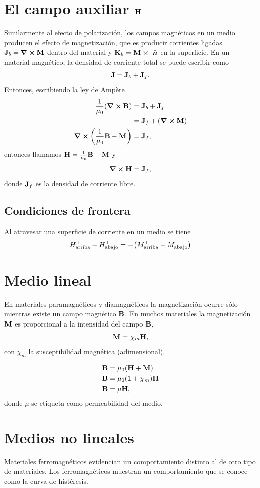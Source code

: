 \section{El campo auxiliar $\vb{H}$}
Similarmente al efecto de polarización, los campos magnéticos 
en un medio producen el efecto de magnetización, que es 
producir corrientes ligadas $\vb{J}_b=\curl{\vb{M}}$ dentro del 
material y $\vb{K}_b=\vb{M}\cp \uv{n}$ en la superficie. En un 
material magnético, la densidad de corriente total se puede 
escribir como 
\begin{align}
\vb{J}=\vb{J}_b+\vb{J}_f.
\end{align}
Entonces, escribiendo la ley de Ampère
\begin{align}
\frac{1}{\mu_0}\qty(\curl{\vb{B}})&=\vb{J}_b+\vb{J}_f\\
&=\vb{J}_f+\qty(\curl{\vb{M}})\\
\curl{\qty(\frac{1}{\mu_0}\vb{B}-\vb{M})}&=\vb{J}_f,
\end{align}
entonces llamamos $\vb{H}=\frac{1}{\mu_0}\vb{B}-\vb{M}$ y
\begin{align}
\curl{\vb{H}}=\vb{J}_f,
\end{align}
donde $\vb{J}_f$ es la densidad de corriente libre.
\subsection{Condiciones de frontera}
Al atravesar una superficie de corriente en un medio se tiene
\begin{align}
H_{\text{arriba}}^{\perp}-H_{\text{abajo}}^{\perp}=
-\qty(M_{\text{arriba}}^{\perp}-M_{\text{abajo}}^{\perp})
\end{align}

\section{Medio lineal}
En materiales paramagnéticos y diamagnéticos la magnetización
ocurre sólo mientras existe un campo magnético $\vb{B}$. En muchos 
materiales la magnetización $\vb{M}$ es proporcional a la intensidad 
del campo $\vb{B}$,
\begin{align}
\vb{M}=\chi_m\vb{H},
\end{align}
con $\chi_m$ la susceptibilidad magnética (adimensional).

\begin{align}
\vb{B}&=\mu_0\qty(\vb{H}+\vb{M})\\
\vb{B}&=\mu_0\qty(1+\chi_m)\vb{H}\\
\vb{B}&=\mu\vb{H},
\end{align}
donde $\mu$ se etiqueta como permeabilidad del medio. 
\section{Medios no lineales}
Materiales ferromagnéticos evidencian un comportamiento distinto
al de otro tipo de materiales. Los ferromagnéticos muestran un comportamiento
que se conoce como la curva de histéresis. 


